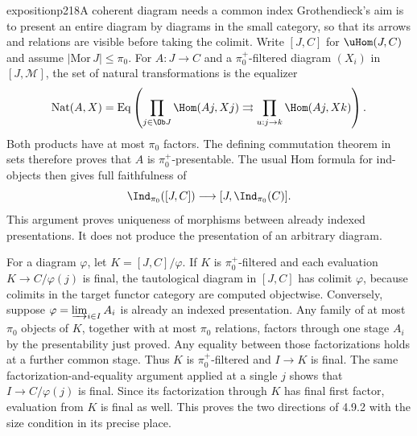 \begin{dcomment}{exposition}{p218}{A coherent diagram needs a common index}
Grothendieck's aim is to present an entire diagram by diagrams in the small category, so that its arrows and relations are visible before taking the colimit. Write $[J,C]$ for $\uHom(J,C)$ and assume $|\mathrm{Mor}\,J|\leq\pi_0$. For $A:J\to C$ and a $\pi_0^+$-filtered diagram $(X_i)$ in $[J,\mathcal M]$, the set of natural transformations is the equalizer
\[
 \operatorname{Nat}(A,X)=
 \operatorname{Eq}\left(
 \prod_{j\in\Ob J}\Hom(Aj,Xj)
 \rightrightarrows
 \prod_{u:j\to k}\Hom(Aj,Xk)\right).
\]
Both products have at most $\pi_0$ factors. The defining commutation theorem in sets therefore proves that $A$ is $\pi_0^+$-presentable. The usual Hom formula for ind-objects then gives full faithfulness of
\[
 \Ind_{\pi_0}([J,C])\longrightarrow[J,\Ind_{\pi_0}(C)].
\]
This argument proves uniqueness of morphisms between already indexed presentations. It does not produce the presentation of an arbitrary diagram.

For a diagram $\varphi$, let $K=[J,C]/\varphi$. If $K$ is $\pi_0^+$-filtered and each evaluation $K\to C/\varphi(j)$ is final, the tautological diagram in $[J,C]$ has colimit $\varphi$, because colimits in the target functor category are computed objectwise. Conversely, suppose $\varphi=\varinjlim_{i\in I}A_i$ is already an indexed presentation. Any family of at most $\pi_0$ objects of $K$, together with at most $\pi_0$ relations, factors through one stage $A_i$ by the presentability just proved. Any equality between those factorizations holds at a further common stage. Thus $K$ is $\pi_0^+$-filtered and $I\to K$ is final. The same factorization-and-equality argument applied at a single $j$ shows that $I\to C/\varphi(j)$ is final. Since its factorization through $K$ has final first factor, evaluation from $K$ is final as well. This proves the two directions of 4.9.2 with the size condition in its precise place.
\end{dcomment}

